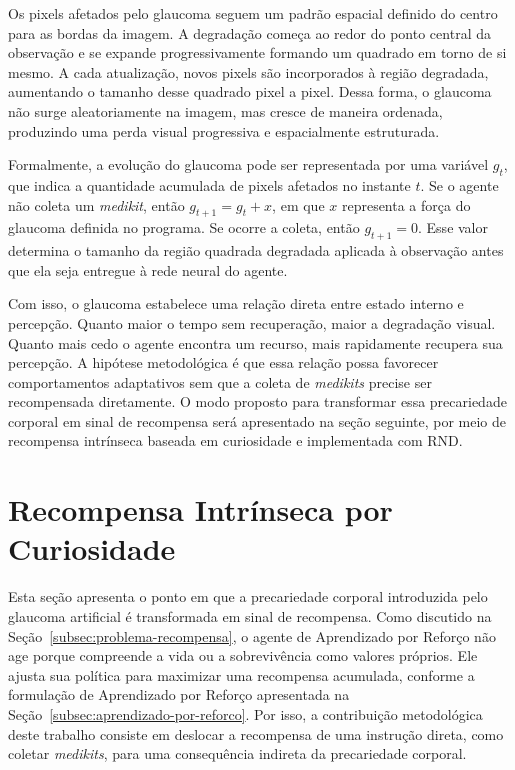 Os pixels afetados pelo glaucoma seguem um padrão espacial definido do centro para as bordas da imagem. A degradação começa ao redor do ponto central da observação e se expande progressivamente formando um quadrado em torno de si mesmo. A cada atualização, novos pixels são incorporados à região degradada, aumentando o tamanho desse quadrado pixel a pixel. Dessa forma, o glaucoma não surge aleatoriamente na imagem, mas cresce de maneira ordenada, produzindo uma perda visual progressiva e espacialmente estruturada.

Formalmente, a evolução do glaucoma pode ser representada por uma variável $g_t$, que indica a quantidade acumulada de pixels afetados no instante $t$. Se o agente não coleta um \textit{medikit}, então $g_{t+1}=g_t+x$, em que $x$ representa a força do glaucoma definida no programa. Se ocorre a coleta, então $g_{t+1}=0$. Esse valor determina o tamanho da região quadrada degradada aplicada à observação antes que ela seja entregue à rede neural do agente.

Com isso, o glaucoma estabelece uma relação direta entre estado interno e percepção. Quanto maior o tempo sem recuperação, maior a degradação visual. Quanto mais cedo o agente encontra um recurso, mais rapidamente recupera sua percepção. A hipótese metodológica é que essa relação possa favorecer comportamentos adaptativos sem que a coleta de \textit{medikits} precise ser recompensada diretamente. O modo proposto para transformar essa precariedade corporal em sinal de recompensa será apresentado na seção seguinte, por meio de recompensa intrínseca baseada em curiosidade e implementada com RND.

\section{Recompensa Intrínseca por Curiosidade}
\label{sec:recompensa-intrinseca-curiosidade}

Esta seção apresenta o ponto em que a precariedade corporal introduzida pelo glaucoma artificial é transformada em sinal de recompensa. Como discutido na Seção~\ref{subsec:problema-recompensa}, o agente de Aprendizado por Reforço não age porque compreende a vida ou a sobrevivência como valores próprios. Ele ajusta sua política para maximizar uma recompensa acumulada, conforme a formulação de Aprendizado por Reforço apresentada na Seção~\ref{subsec:aprendizado-por-reforco}. Por isso, a contribuição metodológica deste trabalho consiste em deslocar a recompensa de uma instrução direta, como coletar \textit{medikits}, para uma consequência indireta da precariedade corporal.

